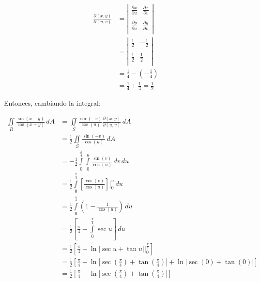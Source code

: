 \documentclass[11pt]{report}
\begin{document}
\begin{equation*}
\begin{split}
    \frac{\partial(x, y)}{\partial(u, v)}
    &= \left|
        \begin{matrix}
            \frac{\partial x}{\partial u} & \frac{\partial x}{\partial v} \\ \\
            \frac{\partial y}{\partial u} & \frac{\partial y}{\partial v} \\
        \end{matrix}
     \right| \\
     &= \left|
         \begin{matrix}
             \frac{1}{2} & -\frac{1}{2} \\ \\
             \frac{1}{2} & \frac{1}{2} \\
         \end{matrix}
      \right| \\
     &= \frac{1}{4} - \left( -\frac{1}{4} \right) \\
     &= \frac{1}{4} + \frac{1}{4} = \frac{1}{2}
\end{split}
\end{equation*}

Entonces, cambiando la integral:

\begin{equation*}
\begin{split}
    \iint \limits_{R} \frac{\sin{(x - y)}}{\cos{(x + y)}} \, dA
    &= \iint \limits_{S} \frac{\sin{(-v)}}{\cos{(u)}} \frac{\partial(x, y)}{\partial(u, v)} \, dA \\
    &= \frac{1}{2} \iint \limits_{S} \frac{\sin{(-v)}}{\cos{(u)}}  \, dA \\
    &= -\frac{1}{2} \int \limits_{0}^{\frac{\pi}{4}} \int \limits_{0}^{u} \frac{\sin{(v)}}{\cos{(u)}}  \, dv \, du \\
    &= \frac{1}{2} \int \limits_{0}^{\frac{\pi}{4}} \left[ \frac{\cos{(v)}}{\cos{(u)}} \right] \Big |_{0}^{u} \, du \\
    &= \frac{1}{2} \int \limits_{0}^{\frac{\pi}{4}} \left( 1 - \frac{1}{\cos{(u)}} \right) \, du \\
    &= \frac{1}{2} \left[ \frac{\pi}{4} - \int \limits_{0}^{\frac{\pi}{4}} \sec{u} \right] \, du \\
    &= \frac{1}{2} \left[ \frac{\pi}{4} - \ln \left| \sec u + \tan u \right| \Big |_0^{\frac{\pi}{4}} \right]  \\
    &= \frac{1}{2} \left[ \frac{\pi}{4}
        - \ln \left| \sec \left( \frac{\pi}{4} \right) + \tan \left( \frac{\pi}{4} \right) \right|
        + \ln \left| \sec \left( 0 \right) + \tan \left( 0 \right) \right| \right] \\
    &= \frac{1}{2} \left[ \frac{\pi}{4}
        - \ln \left| \sec \left( \frac{\pi}{4} \right) + \tan \left( \frac{\pi}{4} \right) \right| \right] \\
\end{split}
\end{equation*}
\end{document}
